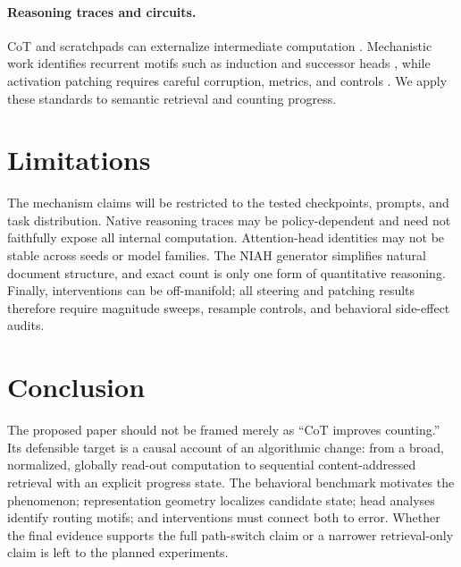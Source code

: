 \documentclass[10pt,twocolumn]{article}
\begin{document}
\paragraph{Reasoning traces and circuits.}
CoT and scratchpads can externalize intermediate computation
\citep{nye2021scratchpad,wei2022cot}. Mechanistic work identifies recurrent motifs such as induction
and successor heads \citep{olsson2022induction,gould2023successor}, while activation patching
requires careful corruption, metrics, and controls \citep{zhang2024patching}.
We apply these standards to semantic retrieval and counting progress.

\section{Limitations}
The mechanism claims will be restricted to the tested checkpoints, prompts, and task distribution.
Native reasoning traces may be policy-dependent and need not faithfully expose all internal
computation. Attention-head identities may not be stable across seeds or model families.
The NIAH generator simplifies natural document structure, and exact count is only one form of
quantitative reasoning. Finally, interventions can be off-manifold; all steering and patching
results therefore require magnitude sweeps, resample controls, and behavioral side-effect audits.

\section{Conclusion}
The proposed paper should not be framed merely as ``CoT improves counting.''
Its defensible target is a causal account of an algorithmic change:
from a broad, normalized, globally read-out computation to sequential content-addressed retrieval
with an explicit progress state. The behavioral benchmark motivates the phenomenon; representation
geometry localizes candidate state; head analyses identify routing motifs; and interventions must
connect both to error. Whether the final evidence supports the full path-switch claim or a narrower
retrieval-only claim is left to the planned experiments.
\end{document}
